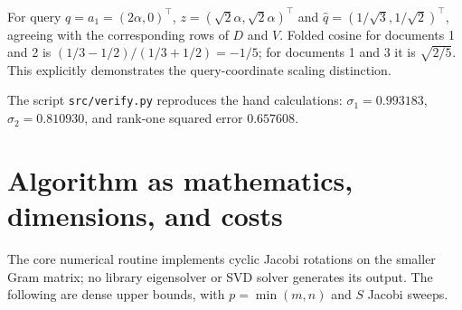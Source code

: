 \documentclass[11pt]{article}
\begin{document}
For query $q=a_1=(2\alpha,0)^\top$,
$z=(\sqrt2\alpha,\sqrt2\alpha)^\top$ and
$\widehat q=(1/\sqrt3,1/\sqrt2)^\top$, agreeing with the corresponding rows
of $D$ and $V$. Folded cosine for documents 1 and 2 is
$(1/3-1/2)/(1/3+1/2)=-1/5$; for documents 1 and 3 it is $\sqrt{2/5}$.
This explicitly demonstrates the query-coordinate scaling distinction.

The script \texttt{src/verify.py} reproduces the hand calculations:
$\sigma_1=0.993183$, $\sigma_2=0.810930$, and rank-one squared error $0.657608$.

\section{Algorithm as mathematics, dimensions, and costs}
The core numerical routine implements cyclic Jacobi rotations on the smaller
Gram matrix; no library eigensolver or SVD solver generates its output.
The following are dense upper bounds, with $p=\min(m,n)$ and $S$ Jacobi sweeps.
\end{document}
